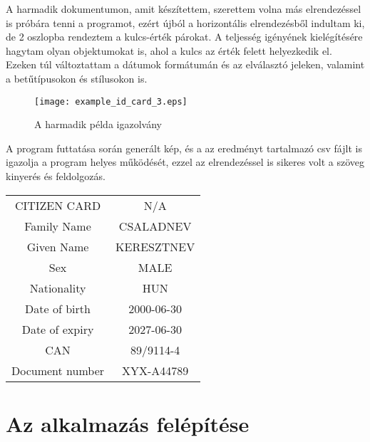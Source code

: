 \documentclass[12pt]{report}
\begin{document}
A harmadik dokumentumon, amit készítettem, szerettem volna más elrendezéssel is próbára tenni a programot, ezért újból a horizontális elrendezésből indultam ki, de 2 oszlopba rendeztem a kulcs-érték párokat. A teljesség igényének kielégítésére hagytam olyan objektumokat is, ahol a kulcs az érték felett helyezkedik el. Ezeken túl változtattam a dátumok formátumán és az elválasztó jeleken, valamint a betűtípusokon és stílusokon is.

\begin{figure}[h]
    \centerline{\texttt{[image: example\_id\_card\_3.eps]}}
    \caption{A harmadik példa igazolvány}
\end{figure}

A program futtatása során generált kép, és a az eredményt tartalmazó csv fájlt is igazolja a program helyes működését, ezzel az elrendezéssel is sikeres volt a szöveg kinyerés és feldolgozás.

\begin{tcolorbox}
    \begin{center}
        \begin{tabular}{ c c }
            CITIZEN CARD & N/A \\ 
            Family Name & CSALADNEV \\ 
            Given Name & KERESZTNEV \\ 
            Sex & MALE \\ 
            Nationality & HUN \\ 
            Date of birth & 2000-06-30 \\ 
            Date of expiry & 2027-06-30 \\ 
            CAN & 89/9114-4 \\ 
            Document number & XYX-A44789 \\ 
        \end{tabular}
    \end{center}
\end{tcolorbox}

\section{Az alkalmazás felépítése}
\end{document}
